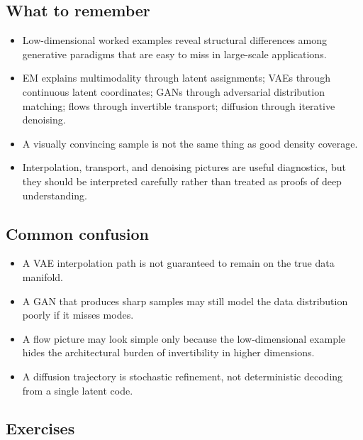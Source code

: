 \subsection*{What to remember}

\begin{itemize}
    \item Low-dimensional worked examples reveal structural differences among generative paradigms that are easy to miss in large-scale applications.
    \item EM explains multimodality through latent assignments; VAEs through continuous latent coordinates; GANs through adversarial distribution matching; flows through invertible transport; diffusion through iterative denoising.
    \item A visually convincing sample is not the same thing as good density coverage.
    \item Interpolation, transport, and denoising pictures are useful diagnostics, but they should be interpreted carefully rather than treated as proofs of deep understanding.
\end{itemize}

\subsection*{Common confusion}

\begin{itemize}
    \item A VAE interpolation path is not guaranteed to remain on the true data manifold.
    \item A GAN that produces sharp samples may still model the data distribution poorly if it misses modes.
    \item A flow picture may look simple only because the low-dimensional example hides the architectural burden of invertibility in higher dimensions.
    \item A diffusion trajectory is stochastic refinement, not deterministic decoding from a single latent code.
\end{itemize}

\subsection*{Exercises}

